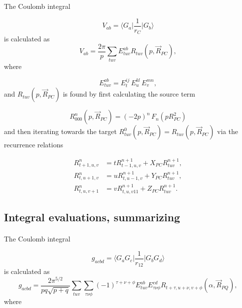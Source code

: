 \documentclass[%
twoside,                 %
final,                   %
10pt]{article}
\begin{document}
The Coulomb integral

\begin{equation}
 V_{ab} = \langle G_a\vert\frac{1}{r_C}\vert G_b\rangle
\end{equation}
is calculated as
\begin{equation}
 V_{ab} = \frac{2\pi}{p}\sum_{tuv}E^{ab}_{tuv} R_{tuv}(p,\vec R_{PC}),
\end{equation}
where

\begin{equation}
 E^{ab}_{tuv} = E^{ij}_t\,E^{kl}_u\,E^{mn}_v,
\end{equation}
and $R_{tuv}(p,\vec R_{PC})$ is found by first calculating the source term

\begin{equation}
 R^n_{000}(p,\vec R_{PC}) = (-2p)^n\,F_n(p R^2_{PC})
\end{equation}
and then iterating towards the target $R^0_{tuv}(p,\vec R_{PC}) = R_{tuv}(p,\vec R_{PC})$ via the recurrence relations

\begin{equation}
 \begin{split}
  R^n_{t+1,u,v} & = tR^{n+1}_{t-1,u,v} + X_{PC} R^{n+1}_{tuv}, \\
  R^n_{t,u+1,v} & = uR^{n+1}_{t,u-1,v} + Y_{PC} R^{n+1}_{tuv}, \\
  R^n_{t,u,v+1} & = vR^{n+1}_{t,u,v11} + Z_{PC} R^{n+1}_{tuv}.
 \end{split}
\end{equation}


\subsection{Integral evaluations, summarizing}

\paragraph{}

The Coulomb integral

\begin{equation}
 g_{acbd} = \langle G_a G_c\vert \frac{1}{r_{12}}\vert G_b G_d\rangle
\end{equation}
is calculated as
\begin{equation}
 g_{acbd} = \frac{2\pi^{5/2}}{pq\sqrt{p+q}}\sum_{tuv}\sum_{\tau\nu\phi}(-1)^{\tau+\nu+\phi}E^{ab}_{tuv}E^{cd}_{\tau\nu\phi}R_{t+\tau,u+\nu,v+\phi}(\alpha,\vec R_{PQ}),
\end{equation}
where
\end{document}
